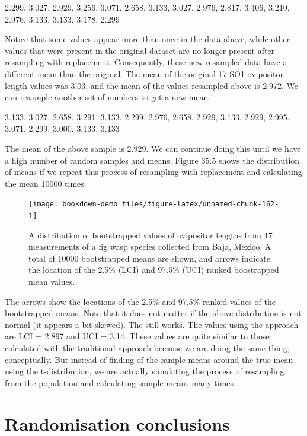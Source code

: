 \documentclass[
  openany]{krantz}
\begin{document}
2.299, 3.027, 2.929, 3.256, 3.071, 2.658, 3.133, 3.027, 2.976, 2.817, 3.406, 3.210, 2.976, 3.133, 3.133, 3.178, 2.299

Notice that some values appear more than once in the data above, while other values that were present in the original dataset are no longer present after resampling with replacement. Consequently, these new resampled data have a different mean than the original.
The mean of the original 17 SO1 ovipositor length values was 3.03, and the mean of the values resampled above is 2.972.
We can resample another set of numbers to get a new mean.

3.133, 3.027, 2.658, 3.291, 3.133, 2.299, 2.976, 2.658, 2.929, 3.133, 2.929, 2.995, 3.071, 2.299, 3.000, 3.133, 3.133

The mean of the above sample is 2.929.
We can continue doing this until we have a high number of random samples and means. Figure 35.5 shows the distribution of means if we repeat this process of resampling with replacement and calculating the mean 10000 times.

\begin{figure}
\texttt{[image: bookdown-demo\_files/figure-latex/unnamed-chunk-162-1]} \caption{A distribution of bootstrapped values of ovipositor lengths from 17 measurements of a fig wasp species collected from Baja, Mexico. A total of 10000 bootstrapped means are shown, and arrows indicate the location of the 2.5\% (LCI) and 97.5\% (UCI) ranked boostrapped mean values.}\label{fig:unnamed-chunk-162}
\end{figure}

The arrows show the locations of the 2.5\% and 97.5\% ranked values of the bootstrapped means.
Note that it does not matter if the above distribution is not normal (it appears a bit skewed).
The  still works.
The values using the  approach are LCI = 2.897 and UCI = 3.14.
These values are quite similar to those calculated with the traditional approach because we are doing the same thing, conceptually.
But instead of finding  of the sample means around the true mean using the t-distribution, we are actually simulating the process of resampling from the population and calculating sample means many times.

\hypertarget{randomisation-conclusions}{%
\section{Randomisation conclusions}\label{randomisation-conclusions}}
\end{document}
